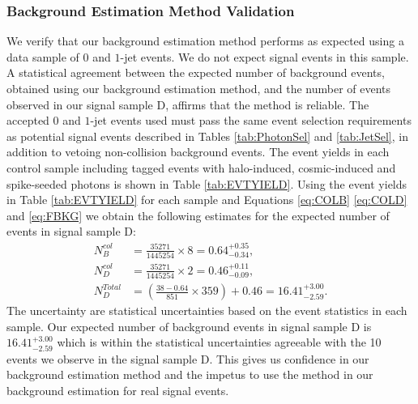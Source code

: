 \subsubsection{Background Estimation Method Validation}
We verify that our background estimation method performs as expected using a data sample of $0$ and $1$-jet events. We do not expect signal events in this sample.
A statistical agreement between the expected number of background events, obtained using our background estimation method, and the number of events observed in our signal sample \textsf{D}, affirms that the method is reliable. The accepted $0$ and $1$-jet events used must pass the same event selection requirements as potential signal events described in Tables \ref{tab:PhotonSel} and \ref{tab:JetSel}, in addition to vetoing non-collision background events. The event yields in each control sample including tagged events with halo-induced, cosmic-induced and spike-seeded photons is shown in Table \ref{tab:EVTYIELD}.
\newline
Using the event yields in Table \ref{tab:EVTYIELD} for each sample and Equations \ref{eq:COLB} \ref{eq:COLD} and \ref{eq:FBKG} we obtain the following estimates for the expected number of events in signal sample \textsf{D}:
\begin{align*} 
 N_{B}^{col} &= \frac{35271}{1445254} \times 8 = 0.64^{+0.35}_{-0.34} , \\
 N_{D}^{col} &= \frac{35271}{1445254} \times 2 = 0.46^{+0.11}_{-0.09} , \\
 N_{D}^{Total} &= \left( \frac{38 - 0.64}{851}\times 359\right) +  0.46 = 16.41^{+3.00}_{-2.59}.
\end{align*}
The uncertainty are statistical uncertainties based on the event statistics in each sample. Our expected number of background events in signal sample \textsf{D} is $16.41^{+3.00}_{-2.59}$  which is within the statistical uncertainties agreeable with the 10 events we observe in the signal sample \textsf{D}. 
This gives us confidence in our background estimation method and the impetus to use the method in our background estimation for real signal events.
